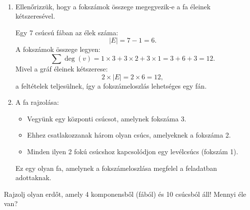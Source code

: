 \begin{solution}
~
\begin{enumerate}
\item Ellenőrizzük, hogy a fokszámok összege megegyezik-e a fa éleinek kétszeresével.

Egy 7 csúcsú fában az élek száma: 
\[
|E|=7-1=6.
\]
A fokszámok összege legyen: 
\[
\sum\deg(v)=1\times3+3\times2+3\times1=3+6+3=12.
\]
Mivel a gráf éleinek kétszerese: 
\[
2\times|E|=2\times6=12,
\]
a feltételek teljesülnek, így a fokszámeloszlás lehetséges egy fán.
\item A fa rajzolása:

\medskip{}

\begin{itemize}
\item Vegyünk egy központi csúcsot, amelynek fokszáma 3. 
\item Ehhez csatlakozzanak három olyan csúcs, amelyeknek a fokszáma 2. 
\item Minden ilyen 2 fokú csúcshoz kapcsolódjon egy levélcsúcs (fokszám
1). 
\end{itemize}
Ez egy olyan fa, amelynek a fokszámeloszlása megfelel a feladatban
adottaknak. 

\end{enumerate}
\end{solution}
\begin{problem}
Rajzolj olyan erdőt, amely 4 komponensből (fából) és 10 csúcsból áll!
Mennyi éle van?
\end{problem}

